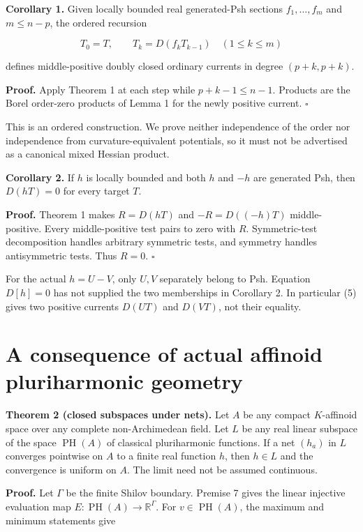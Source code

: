 \documentclass[
  11pt,
]{article}
\begin{document}
\textbf{Corollary 1.} Given locally bounded real generated-Psh sections
\(f_1,\ldots,f_m\) and \(m\leq n-p\), the ordered recursion

\[T_0=T,\qquad T_k=D(f_kT_{k-1})\quad(1\leq k\leq m)\]

defines middle-positive doubly closed ordinary currents in degree
\((p+k,p+k)\).

\textbf{Proof.} Apply Theorem 1 at each step while \(p+k-1\leq n-1\).
Products are the Borel order-zero products of Lemma 1 for the newly
positive current. \(\square\)

This is an ordered construction. We prove neither independence of the
order nor independence from curvature-equivalent potentials, so it must
not be advertised as a canonical mixed Hessian product.

\textbf{Corollary 2.} If \(h\) is locally bounded and both \(h\) and
\(-h\) are generated Psh, then \(D(hT)=0\) for every target \(T\).

\textbf{Proof.} Theorem 1 makes \(R=D(hT)\) and \(-R=D((-h)T)\)
middle-positive. Every middle-positive test pairs to zero with \(R\).
Symmetric-test decomposition handles arbitrary symmetric tests, and
symmetry handles antisymmetric tests. Thus \(R=0\). \(\square\)

For the actual \(h=U-V\), only \(U,V\) separately belong to Psh.
Equation \(D[h]=0\) has not supplied the two memberships in Corollary 2.
In particular (5) gives two positive currents \(D(UT)\) and \(D(VT)\),
not their equality.

\section{A consequence of actual affinoid pluriharmonic
geometry}\label{a-consequence-of-actual-affinoid-pluriharmonic-geometry}

\textbf{Theorem 2 (closed subspaces under nets).} Let \(A\) be any
compact \(K\)-affinoid space over any complete non-Archimedean field.
Let \(L\) be any real linear subspace of the space
\(\operatorname{PH}(A)\) of classical pluriharmonic functions. If a net
\((h_a)\) in \(L\) converges pointwise on \(A\) to a finite real
function \(h\), then \(h\in L\) and the convergence is uniform on \(A\).
The limit need not be assumed continuous.

\textbf{Proof.} Let \(\Gamma\) be the finite Shilov boundary. Premise 7
gives the linear injective evaluation map
\(E:\operatorname{PH}(A)\to\mathbb R^\Gamma\). For
\(v\in\operatorname{PH}(A)\), the maximum and minimum statements give
\end{document}
